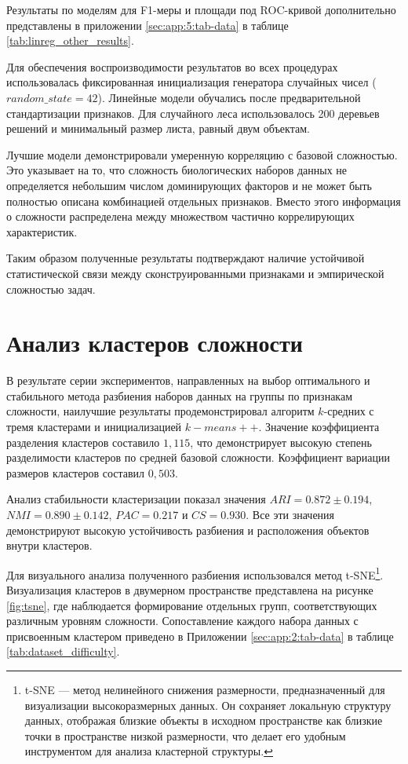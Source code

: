 \documentclass[specification,annotation,times]{itmo-student-thesis}
\begin{document}
Результаты по моделям для F1-меры и площади под ROC-кривой дополнительно представлены в приложении \ref{sec:app:5:tab-data} в таблице \ref{tab:linreg_other_results}.

Для обеспечения воспроизводимости результатов во всех процедурах использовалась фиксированная инициализация 
генератора случайных чисел ($random\_state = 42$).
Линейные модели обучались после предварительной стандартизации признаков. Для случайного леса использовалось 200 
деревьев решений и минимальный размер листа, равный двум объектам.

Лучшие модели демонстрировали умеренную корреляцию с базовой сложностью. Это указывает на то, что сложность биологических наборов данных не определяется небольшим числом доминирующих факторов и не может быть полностью описана комбинацией отдельных признаков. Вместо этого информация о сложности распределена между множеством частично коррелирующих характеристик.

Таким образом полученные результаты подтверждают наличие устойчивой статистической связи между сконструированными 
признаками и эмпирической сложностью задач.

\section{Анализ кластеров сложности}

В результате серии экспериментов, 
направленных на выбор оптимального и стабильного метода разбиения наборов данных на группы по признакам сложности, 
наилучшие результаты продемонстрировал алгоритм $k$-средних с тремя кластерами и инициализацией $k-means++$. 
Значение коэффициента разделения кластеров составило $1,115$, 
что демонстрирует высокую степень разделимости кластеров по средней базовой сложности.
Коэффициент вариации размеров кластеров составил $0,503$.

Анализ стабильности кластеризации показал значения $ARI = 0.872 \pm 0.194$, $NMI = 0.890 \pm 0.142$, $PAC = 0.217$ и $CS = 0.930$. 
Все эти значения демонстрируют высокую устойчивость разбиения и расположения объектов внутри кластеров.

Для визуального анализа полученного разбиения использовался метод t-SNE\footnote{t-SNE — метод нелинейного снижения размерности, предназначенный для визуализации высокоразмерных данных. Он сохраняет локальную структуру данных, отображая близкие объекты в исходном пространстве как близкие точки в пространстве низкой размерности, что делает его удобным инструментом для анализа кластерной структуры.}. Визуализация кластеров в двумерном пространстве представлена на рисунке \ref{fig:tsne}, где наблюдается формирование отдельных групп, соответствующих различным уровням сложности. Сопоставление каждого набора данных с присвоенным кластером приведено в Приложении \ref{sec:app:2:tab-data} в таблице \ref{tab:dataset_difficulty}.
\end{document}
